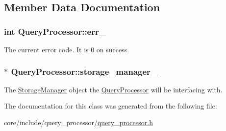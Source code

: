 \subsection{Member Data Documentation}
\hypertarget{classQueryProcessor_ac62ff5cd45c6813c674f00d5f7c379fb}{}
\subsubsection[{err\+\_\+}]{\setlength{\rightskip}{0pt plus 5cm}int Query\+Processor\+::err\+\_\+\hspace{0.3cm}{\ttfamily [private]}}\label{classQueryProcessor_ac62ff5cd45c6813c674f00d5f7c379fb}
The current error code. It is 0 on success. \hypertarget{classQueryProcessor_a3cc164cc6022e092ca7cc42d2be88aa7}{}
\subsubsection[{storage\+\_\+manager\+\_\+}]{$\ast$ Query\+Processor\+::storage\+\_\+manager\+\_\+\hspace{0.3cm}{\ttfamily [private]}}\label{classQueryProcessor_a3cc164cc6022e092ca7cc42d2be88aa7}
The \hyperlink{classStorageManager}{Storage\+Manager} object the \hyperlink{classQueryProcessor}{Query\+Processor} will be interfacing with. 

The documentation for this class was generated from the following file\+:\begin{DoxyCompactItemize}
\item 
core/include/query\+\_\+processor/\hyperlink{query__processor_8h}{query\+\_\+processor.\+h}\end{DoxyCompactItemize}
